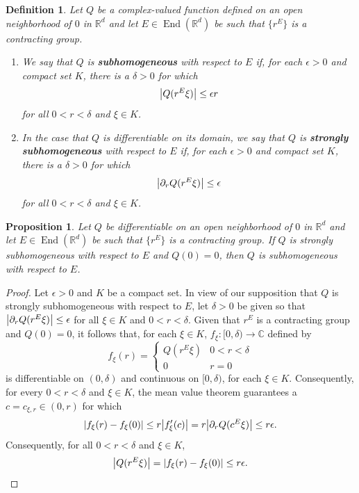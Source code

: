 \documentclass[11pt]{article}
\newtheorem{definition}[theorem]{Definition}
\newtheorem{proposition}[theorem]{Proposition}
\newcommand\End{\operatorname{End}} %
\begin{document}
\begin{definition}\label{def:homogeneous_types}
Let $Q$ be a complex-valued function defined on an open neighborhood of $0$ in $\mathbb{R}^d$ and let $E\in\End(\mathbb{R}^d)$ be such that $\{r^E\}$ is a contracting group.
\begin{enumerate}
\item We say that $Q$ is \textbf{subhomogeneous} with respect to $E$ if, for each $\epsilon>0$ and compact set $K$, there is a $\delta>0$ for which
\begin{equation*}
\abs{Q(r^E\xi)}\leq \epsilon r
\end{equation*}
for all $0<r<\delta$ and $\xi\in K$.
\item In the case that $Q$ is differentiable on its domain, we say that $Q$ is \textbf{strongly subhomogeneous} with respect to $E$ if, for each $\epsilon>0$ and compact set $K$, there is a $\delta>0$ for which
\begin{equation*}
\abs{\partial_r Q(r^E\xi)}\leq \epsilon
\end{equation*}
for all $0<r<\delta$ and $\xi\in K$.
\end{enumerate}
\end{definition}

\begin{proposition}\label{prop:supersub_implies_sub}
Let $Q$ be differentiable on an open neighborhood of $0$ in $\mathbb{R}^d$ and let $E\in\End(\mathbb{R}^d)$ be such that $\{r^E\}$ is a contracting group. If $Q$ is strongly subhomogeneous with respect to $E$ and $Q(0)=0$, then $Q$ is subhomogeneous with respect to $E$.
\end{proposition}
\begin{proof}
Let $\epsilon>0$ and $K$ be a compact set.  In view of our supposition that $Q$ is strongly subhomogeneous with respect to $E$, let $\delta>0$ be given so that $\abs{\partial_r Q(r^E\xi)}\leq \epsilon$ for all $\xi\in K$ and $0<r< \delta$. Given that $r^E$ is a contracting group and $Q(0)=0$, it follows that, for each $\xi\in K$, $f_{\xi}:[0,\delta)\to\mathbb{C}$ defined by
\begin{equation*}
f_{\xi}(r)=\begin{cases}
Q(r^E\xi) & 0<r<\delta\\
0 & r=0
\end{cases}
\end{equation*}
is differentiable on $(0,\delta)$ and continuous on $[0,\delta)$, for each $\xi\in K$. Consequently, for every $0<r<\delta$ and $\xi\in K$, the mean value theorem guarantees a $c=c_{\xi,r}\in (0,r)$ for which 
\begin{equation*}
\abs{f_{\xi}(r)-f_{\xi}(0)}\leq r\abs{f_{\xi}'(c)}=r\abs{\partial_r Q(c^E\xi)}\leq r\epsilon.
\end{equation*}
Consequently, for all $0<r<\delta$ and $\xi\in K$,
\begin{equation*}
\abs{Q(r^E\xi)}=\abs{f_{\xi}(r)-f_{\xi}(0)}\leq r\epsilon.
\end{equation*}
\end{proof}
\end{document}
